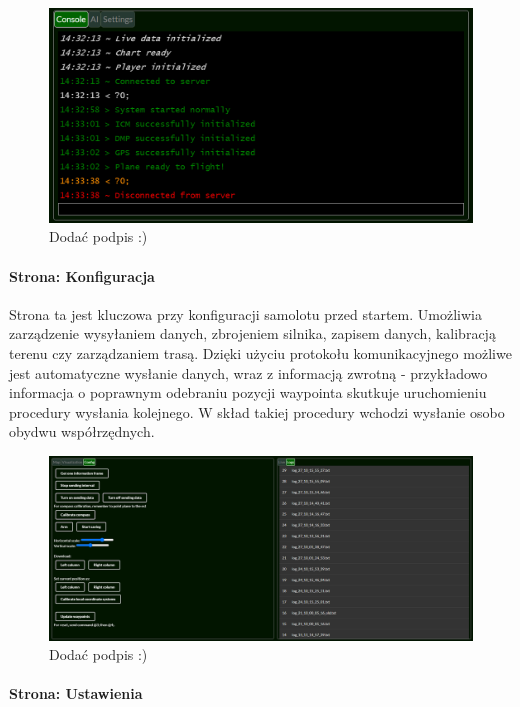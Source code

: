 \documentclass[12pt, a4paper]{article}
\begin{document}
 \begin{figure}[H]
    \centering
    \includegraphics[width=1\textwidth]{konsola}
    \caption{Dodać podpis :)}
\end{figure}

\paragraph{Strona: Konfiguracja}\mbox{}

Strona ta jest kluczowa przy konfiguracji samolotu przed startem. Umożliwia zarządzenie wysyłaniem danych, zbrojeniem silnika, zapisem danych, kalibracją terenu czy zarządzaniem trasą. Dzięki użyciu protokołu komunikacyjnego możliwe jest automatyczne wysłanie danych, wraz z informacją zwrotną - przykładowo informacja o poprawnym odebraniu pozycji waypointa skutkuje uruchomieniu procedury wysłania kolejnego. W skład takiej procedury wchodzi wysłanie osobo obydwu współrzędnych.

 \begin{figure}[H]
    \centering
    \includegraphics[width=1\textwidth]{config}
    \caption{Dodać podpis :)}
\end{figure}

\paragraph{Strona: Ustawienia}\mbox{}
\end{document}
